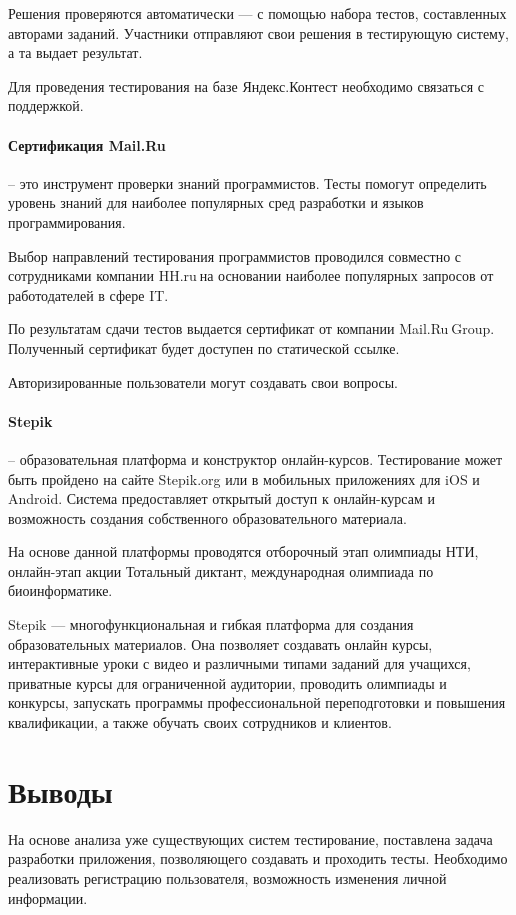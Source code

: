 Решения проверяются автоматически — с помощью набора тестов, составленных авторами заданий. Участники отправляют свои решения в тестирующую систему, а та выдает результат. 

Для проведения тестирования на базе Яндекс.Контест необходимо связаться с поддержкой.

\paragraph{Сертификация Mail.Ru} -- это инструмент проверки знаний программистов. Тесты помогут определить уровень знаний для наиболее популярных сред разработки и языков программирования. 

Выбор направлений тестирования программистов проводился совместно с сотрудниками компании HH.ru на основании наиболее популярных запросов от работодателей в сфере IT.

По результатам сдачи тестов выдается сертификат от компании Mail.Ru Group. Полученный сертификат будет доступен по статической ссылке.

Авторизированные пользователи могут создавать свои вопросы. 

\paragraph{Stepik} -- образовательная платформа и конструктор онлайн-курсов. Тестирование может быть пройдено на сайте Stepik.org или в мобильных приложениях для iOS и Android. Система предоставляет открытый доступ к онлайн-курсам и возможность создания собственного образовательного материала.

На основе данной платформы проводятся отборочный этап олимпиады НТИ, онлайн-этап акции Тотальный диктант, международная олимпиада по биоинформатике.

Stepik — многофункциональная и гибкая платформа для создания образовательных материалов. Она позволяет создавать онлайн курсы, интерактивные уроки с видео и различными типами заданий для учащихся, приватные курсы для ограниченной аудитории, проводить олимпиады и конкурсы, запускать программы профессиональной переподготовки и повышения квалификации, а также обучать своих сотрудников и клиентов. 


\section{Выводы} 
На основе анализа уже существующих систем тестирование, поставлена задача разработки приложения, позволяющего создавать и проходить тесты. Необходимо реализовать регистрацию пользователя, возможность изменения личной информации. 

